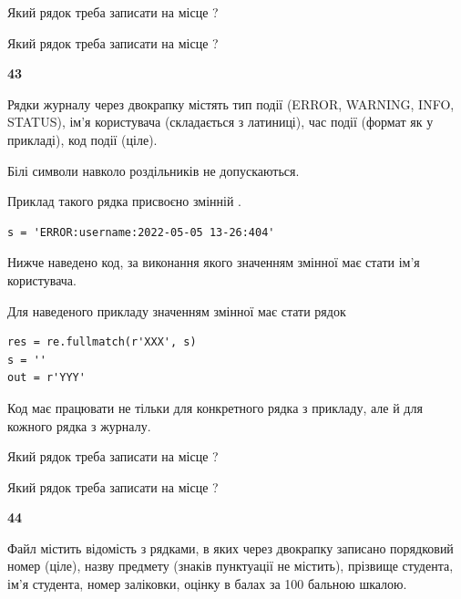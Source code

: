 Який рядок треба записати на місце  ?\par
\vspace{5mm}


Який рядок треба записати на місце  ?\par


\newpage

{\begin {center}\textbf{ 43}\end {center}}\par
Рядки журналу через двокрапку містять тип події (ERROR, WARNING, INFO, STATUS), ім'я користувача (складається з латиниці), час події (фор\-мат як у прикладі), код події (ціле).

Білі символи навколо роздільників не допускаються.

Приклад такого рядка присвоєно змінній .



\begin{verbatim}
s = 'ERROR:username:2022-05-05 13-26:404'
\end{verbatim}


Нижче наведено код, за виконання якого значенням змінної  має стати ім'я користувача.

Для наведеного прикладу значенням змінної  має стати рядок 



\begin{verbatim}
res = re.fullmatch(r'XXX', s)
s = ''
out = r'YYY'
\end{verbatim}


Код має працювати не тільки для конкретного рядка з прикладу, але й для кожного рядка з журналу.




Який рядок треба записати на місце  ?\par
\vspace{5mm}


Який рядок треба записати на місце  ?\par


\newpage

{\begin {center}\textbf{ 44}\end {center}}\par
Файл  містить відомість з рядками, в яких через двокрапку записано поряд\-ковий номер (ціле), назву предмету (знаків пунктуації не містить), прізвище студента, ім'я студента, номер заліковки, оцінку в балах за 100 бальною шкалою.

